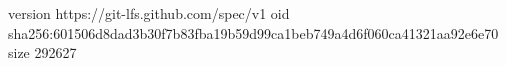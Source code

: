 version https://git-lfs.github.com/spec/v1
oid sha256:601506d8dad3b30f7b83fba19b59d99ca1beb749a4d6f060ca41321aa92e6e70
size 292627
